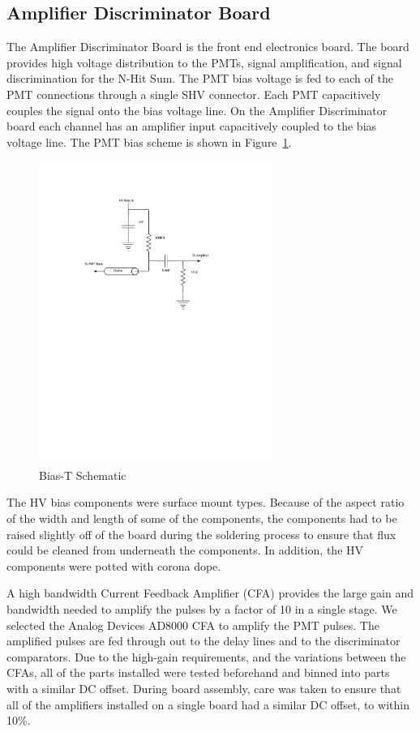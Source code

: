 \documentclass{JINST}
\begin{document}
\subsection{Amplifier Discriminator Board}
\label{sec:Amp-Disc}
%
The Amplifier Discriminator Board is the front end electronics board.
The board provides high voltage distribution to the PMTs, signal
amplification, and signal discrimination for the N-Hit Sum.  The PMT
bias voltage is fed to each of the PMT connections through a single
SHV connector.  Each PMT capacitively couples the signal onto the bias
voltage line.  On the Amplifier Discriminator board each channel has
an amplifier input capacitively coupled to the bias voltage line.  The
PMT bias scheme is shown in Figure~\ref{fig:bias}.

\begin{figure}[ht]
\begin{center}
\includegraphics[width=3in, keepaspectratio=true, trim=1.5in 5.5in 2in 1.25in, clip=true]{graphics/bias}
\caption{Bias-T Schematic
\label{fig:bias}}
\end{center}
\end{figure}

The HV bias components were surface mount types.  Because of the
aspect ratio of the width and length of some of the components, the
components had to be raised slightly off of the board during the
soldering process to ensure that flux could be cleaned from underneath
the components.  In addition, the HV components were potted with
corona dope.

A high bandwidth Current Feedback Amplifier (CFA) provides the large
gain and bandwidth needed to amplify the pulses by a factor of 10 in a
single stage.  We selected the Analog Devices AD8000 CFA to amplify
the PMT pulses.  The amplified pulses are fed through out to the delay
lines and to the discriminator comparators.  Due to the high-gain
requirements, and the variations between the CFAs, all of the parts
installed were tested beforehand and binned into parts with a similar
DC offset.  During board assembly, care was taken to ensure that all
of the amplifiers installed on a single board had a similar DC offset,
to within 10\%.
\end{document}
